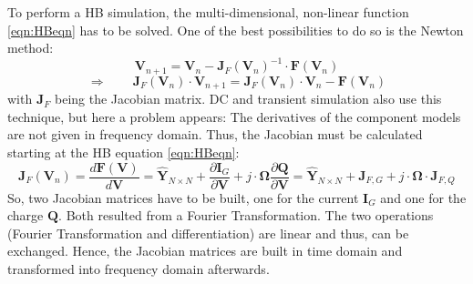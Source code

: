 To perform a HB simulation, the multi-dimensional, non-linear function
\ref{eqn:HBeqn} has to be solved. One of the best possibilities to
do so is the Newton method:
\begin{equation}
\textbf{V}_{n+1} = \textbf{V}_n - \textbf{J}_F (\textbf{V}_n)^{-1}
                   \cdot \textbf{F} (\textbf{V}_n)
\end{equation}
\begin{equation}
\label{eqn:HBnewton}
\Rightarrow \qquad \textbf{J}_F (\textbf{V}_n) \cdot \textbf{V}_{n+1}
    = \textbf{J}_F (\textbf{V}_n) \cdot \textbf{V}_n - \textbf{F} (\textbf{V}_n)
\end{equation}
with $\textbf{J}_F$ being the Jacobian matrix. DC and transient
simulation also use this technique, but here a problem appears:
The derivatives of the component models are not given in frequency
domain. Thus, the Jacobian must be calculated starting at the HB
equation \ref{eqn:HBeqn}:
\begin{equation}
\label{eqn:HBjacobi}
\boldsymbol{J}_F (\boldsymbol{V}_n) = \frac{d\boldsymbol{F} (\boldsymbol{V})}{d\boldsymbol{V}}
    = \boldsymbol{\hat{Y}}_{N \times N} + \frac{\partial \boldsymbol{I}_G}{\partial \boldsymbol{V}}
     + j\cdot \boldsymbol{\Omega}\frac{\partial \boldsymbol{Q}}{\partial \boldsymbol{V}}
    = \boldsymbol{\hat{Y}}_{N \times N} + \boldsymbol{J}_{F,G}
     + j\cdot \boldsymbol{\Omega}\cdot\boldsymbol{J}_{F,Q}
\end{equation}
So, two Jacobian matrices have to be built, one for the current
$\boldsymbol{I}_G$ and one for the charge $\boldsymbol{Q}$. Both resulted
from a Fourier Transformation. The two operations (Fourier Transformation
and differentiation) are linear and thus, can be exchanged. Hence, the
Jacobian matrices
are built in time domain and transformed into frequency domain afterwards.

\addvspace{12pt}

